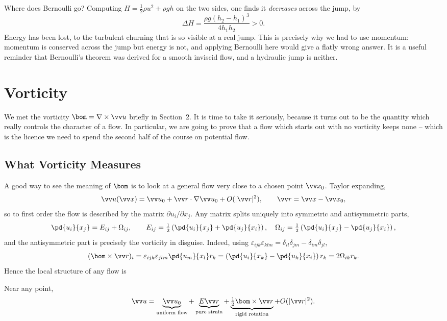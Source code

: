 \begin{example}
	Where does Bernoulli go? Computing $H = \tfrac{1}{2}\rho u^2 + \rho g h$ on the two sides, one finds it \emph{decreases} across the jump, by
	$$
	\Delta H = \frac{\rho g (h_2 - h_1)^3}{4h_1 h_2} > 0.
	$$
	Energy has been lost, to the turbulent churning that is so visible at a real jump. This is precisely why we had to use momentum: momentum is conserved across the jump but energy is not, and applying Bernoulli here would give a flatly wrong answer. It is a useful reminder that Bernoulli's theorem was derived for a smooth inviscid flow, and a hydraulic jump is neither.
\end{example}

\section{Vorticity} \label{sec:vorticity}

We met the vorticity $\bom = \nabla \times \vv u$ briefly in Section~2. It is time to take it seriously, because it turns out to be the quantity which really controls the character of a flow. In particular, we are going to prove that a flow which starts out with no vorticity keeps none -- which is the licence we need to spend the second half of the course on potential flow.

\subsection{What Vorticity Measures}

A good way to see the meaning of $\bom$ is to look at a general flow very close to a chosen point $\vv x_0$. Taylor expanding,
$$
\vv u(\vv x) = \vv u_0 + \vv r \cdot \nabla \vv u_0 + O(|\vv r|^2), \qquad \vv r = \vv x - \vv x_0,
$$
so to first order the flow is described by the matrix $\partial u_i / \partial x_j$. Any matrix splits uniquely into symmetric and antisymmetric parts,
$$
\pd{u_i}{x_j} = E_{ij} + \Omega_{ij}, \qquad E_{ij} = \tfrac{1}{2}\left(\pd{u_i}{x_j} + \pd{u_j}{x_i}\right), \quad \Omega_{ij} = \tfrac{1}{2}\left(\pd{u_i}{x_j} - \pd{u_j}{x_i}\right),
$$
and the antisymmetric part is precisely the vorticity in disguise. Indeed, using $\varepsilon_{ijk}\varepsilon_{klm} = \delta_{il}\delta_{jm} - \delta_{im}\delta_{jl}$,
$$
(\bom \times \vv r)_i = \varepsilon_{ijk}\varepsilon_{jlm}\pd{u_m}{x_l} r_k = \left(\pd{u_i}{x_k} - \pd{u_k}{x_i}\right)r_k = 2\Omega_{ik}r_k.
$$
Hence the local structure of any flow is

\begin{proposition}
	Near any point,
	$$
	\vv u = \underbrace{\vv u_0}_{\text{uniform flow}} + \underbrace{E\vv r}_{\text{pure strain}} + \underbrace{\tfrac{1}{2}\bom \times \vv r}_{\text{rigid rotation}} + O(|\vv r|^2).
	$$
\end{proposition}

